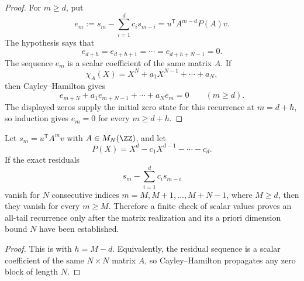 \begin{proof}
For \(m\ge d\), put
\[
  e_m:=s_m-\sum_{i=1}^d c_i s_{m-i}
  =
  u^{\mathsf T}A^{m-d}P(A)v.
\]
The hypothesis says that
\[
  e_{d+h}=e_{d+h+1}=\cdots=e_{d+h+N-1}=0.
\]
The sequence \(e_m\) is a scalar coefficient of the same matrix \(A\).  If
\[
  \chi_A(X)=X^N+a_1X^{N-1}+\cdots+a_N,
\]
then Cayley--Hamilton gives
\[
  e_{m+N}+a_1e_{m+N-1}+\cdots+a_Ne_m=0
  \qquad(m\ge d).
\]
The displayed zeros supply the initial zero state for this recurrence at
\(m=d+h\), so induction gives \(e_m=0\) for every \(m\ge d+h\).
\end{proof}

\begin{corollary}
\label{cor:finite-scalar-check-with-order-bound}
Let \(s_m=u^{\mathsf T}A^m v\) with \(A\in M_N(\ZZ)\), and let
\[
  P(X)=X^d-c_1X^{d-1}-\cdots-c_d.
\]
If the exact residuals
\[
  s_m-\sum_{i=1}^d c_i s_{m-i}
\]
vanish for \(N\) consecutive indices \(m=M,M+1,\dots,M+N-1\), where
\(M\ge d\), then they vanish for every \(m\ge M\).  Therefore a finite check of
scalar values proves an all-tail recurrence only after the matrix realization
and its a priori dimension bound \(N\) have been established.
\end{corollary}

\begin{proof}
This is  with \(h=M-d\).  Equivalently,
the residual sequence is a scalar coefficient of the same \(N\times N\) matrix
\(A\), so Cayley--Hamilton propagates any zero block of length \(N\).
\end{proof}

